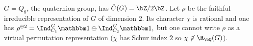  \begin{example}
    $G = Q_8$, the quaternion group, has $\C(G) = \bZ / 2 \bZ$. Let $\rho$ be the faithful irreducible representation of $G$ of dimension $2$. Its character $\chi$ is rational and one has 
    $ \rho^{\oplus 2} = \Ind_{C_1}^G \trivial \ominus \Ind_{C_2}^G \trivial, $
    but one cannot write $\rho$ as a virtual permutation representation ($\chi$ has Schur index $2$ so $\chi \not\in \R_{\bQ}(G)$).  
 \end{example}


